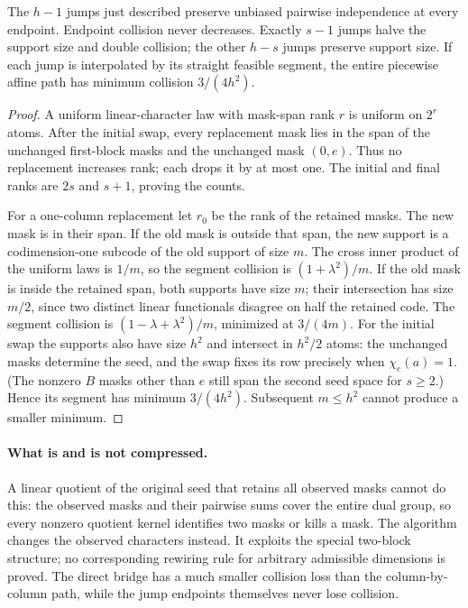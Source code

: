 \begin{proposition}\label{prop:compression-jumps}
The $h-1$ jumps just described preserve unbiased pairwise independence
at every endpoint. Endpoint collision never decreases. Exactly $s-1$
jumps halve the support size and double collision; the other $h-s$
jumps preserve support size. If each jump is interpolated by its straight
feasible segment, the entire piecewise affine path has minimum collision
$3/(4h^2)$.
\end{proposition}
\begin{proof}
A uniform linear-character law with mask-span rank $r$ is uniform on
$2^r$ atoms. After the initial swap, every replacement mask lies in the
span of the unchanged first-block masks and the unchanged mask $(0,e)$.
Thus no replacement increases rank; each drops it by at most one.
The initial and final ranks are $2s$ and $s+1$, proving the counts.

For a one-column replacement let $r_0$ be the rank of the retained masks.
The new mask is in their span. If the old mask is outside that span, the
new support is a codimension-one subcode of the old support of size $m$.
The cross inner product of the uniform laws is $1/m$, so the segment
collision is $(1+\lambda^2)/m$. If the old mask is inside the retained
span, both supports have size $m$; their intersection has size $m/2$,
since two distinct linear functionals disagree on half the retained
code. The segment collision is
$(1-\lambda+\lambda^2)/m$, minimized at $3/(4m)$.
For the initial swap the supports also have size $h^2$ and intersect in
$h^2/2$ atoms: the unchanged masks determine the seed, and the swap
fixes its row precisely when $\chi_e(a)=1$. (The nonzero $B$ masks
other than $e$ still span the second seed space for $s\ge2$.) Hence
its segment has minimum $3/(4h^2)$. Subsequent $m\le h^2$ cannot
produce a smaller minimum.
\end{proof}

\paragraph{What is and is not compressed.}
A linear quotient of the original seed that retains all observed masks
cannot do this: the observed masks and their pairwise sums cover the
entire dual group, so every nonzero quotient kernel identifies two masks
or kills a mask. The algorithm changes the observed characters instead.
It exploits the special two-block structure; no corresponding rewiring
rule for arbitrary admissible dimensions is proved. The direct bridge
has a much smaller collision loss than the column-by-column path, while
the jump endpoints themselves never lose collision.

